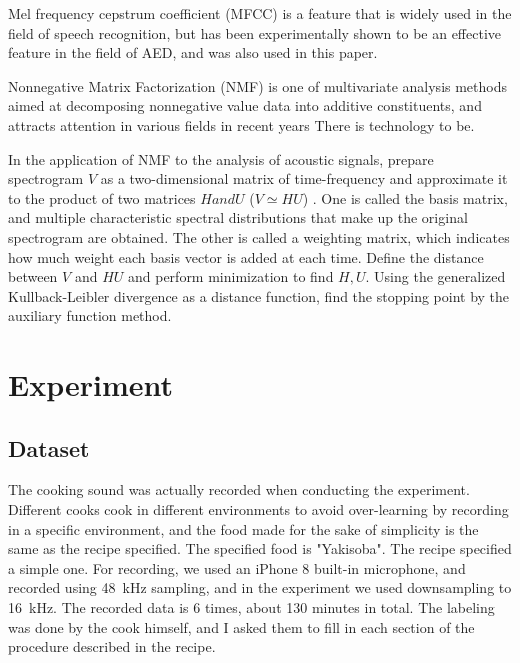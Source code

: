 \documentclass[sigchi]{acmart}
\begin{document}
Mel frequency cepstrum coefficient (MFCC) is a feature that is widely used in the field of speech recognition, but has been experimentally shown to be an effective feature in the field of AED, and was also used in this paper.

Nonnegative Matrix Factorization (NMF) is one of multivariate analysis methods aimed at decomposing nonnegative value data into additive constituents, and attracts attention in various fields in recent years There is technology to be.

In the application of NMF to the analysis of acoustic signals, prepare spectrogram $ V $ as a two-dimensional matrix of time-frequency and approximate it to the product of two matrices $ H and U $ ($ V \simeq HU $) . One is called the basis matrix, and multiple characteristic spectral distributions that make up the original spectrogram are obtained. The other is called a weighting matrix, which indicates how much weight each basis vector is added at each time. Define the distance between $ V $ and $ HU $ and perform minimization to find $ H, U $.
Using the generalized Kullback-Leibler divergence as a distance function, find the stopping point by the auxiliary function method.

\section{Experiment}
\subsection{Dataset}
The cooking sound was actually recorded when conducting the experiment. Different cooks cook in different environments to avoid over-learning by recording in a specific environment, and the food made for the sake of simplicity is the same as the recipe specified.
The specified food is "Yakisoba". The recipe specified a simple one.
For recording, we used an iPhone 8 built-in microphone, and recorded using \SI{48}{kHz} sampling, and in the experiment we used downsampling to \SI{16}{kHz}. The recorded data is 6 times, about 130 minutes in total.
The labeling was done by the cook himself, and I asked them to fill in each section of the procedure described in the recipe.
\end{document}
